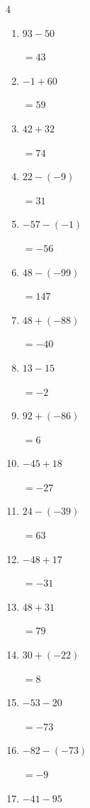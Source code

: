 \begin{multicols}{4}
\begin{enumerate}
        $=86$

  \item $93-50$

        $=43$

  \item $-1+60$

        $=59$

  \item $42+32$

        $=74$

  \item $22-(-9)$

        $=31$

  \item $-57-(-1)$

        $=-56$

  \item $48-(-99)$

        $=147$

  \item $48+(-88)$

        $=-40$

  \item $13-15$

        $=-2$

  \item $92+(-86)$

        $=6$

  \item $-45+18$

        $=-27$

\columnbreak %

  \item $24-(-39)$

        $=63$

  \item $-48+17$

        $=-31$

  \item $48+31$

        $=79$

  \item $30+(-22)$

        $=8$

  \item $-53-20$

        $=-73$

  \item $-82-(-73)$

        $=-9$

  \item $-41-95$


\end{enumerate}
\end{multicols}
